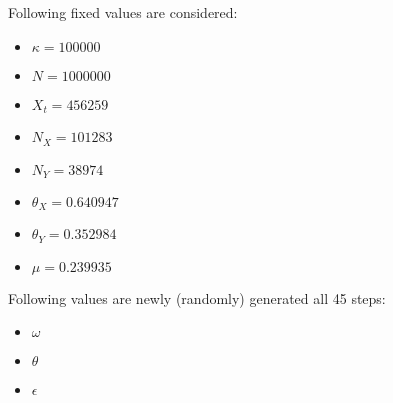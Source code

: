 Following fixed values are considered:
\begin{itemize}
\item $\kappa = 100000$
\item $N = 1000000$
\item $X_t = 456259$
\item $N_X = 101283$
\item $N_Y = 38974$
\item $\theta_X = 0.640947$
\item $\theta_Y = 0.352984$
\item $\mu = 0.239935$
\end{itemize}
Following values are newly (randomly) generated all 45 steps:
\begin{itemize}
\item $\omega$
\item $\theta$
\item $\epsilon$
\end{itemize}
